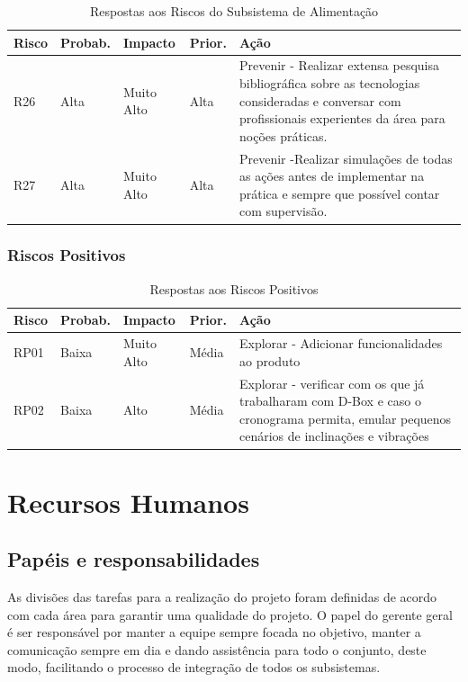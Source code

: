 \begin{table}[H]
\centering
\caption{Respostas aos Riscos do Subsistema de Alimentação}
\label{respostas-8}
\begin{tabular}{|l|l|l|l|p{9cm}|}
\hline
Risco & Probab.    & Impacto    & Prior. & Ação      \\
\hline


R26 & Alta & Muito Alto & Alta & Prevenir - Realizar extensa pesquisa bibliográfica sobre as tecnologias consideradas e conversar com profissionais experientes da área para noções práticas. \\
R27 & Alta & Muito Alto & Alta & Prevenir -Realizar simulações de todas as ações antes de implementar na prática e sempre que possível contar com supervisão. \\

\hline

\end{tabular}
\end{table}

\subsubsection{Riscos Positivos}

\begin{table}[ht]
\centering
\caption{Respostas aos Riscos Positivos}
\label{respostas-9}
\begin{tabular}{|l|l|l|l|p{9cm}|}
\hline
Risco & Probab.    & Impacto    & Prior. & Ação      \\
\hline
 
RP01 & Baixa & Muito Alto & Média & Explorar - Adicionar funcionalidades ao produto \\
RP02 & Baixa & Alto & Média & Explorar - verificar com os que já trabalharam com D-Box e caso o cronograma permita, emular pequenos cenários de inclinações e vibrações \\
\hline
\end{tabular}
\end{table}

\section{Recursos Humanos}
\subsection{Papéis e responsabilidades}

	As divisões das tarefas para a realização do projeto foram definidas de acordo com cada área para garantir uma qualidade do projeto. O papel do gerente geral é ser responsável por manter a equipe sempre focada no objetivo, manter a comunicação sempre em dia e dando assistência para todo o conjunto, deste modo, facilitando o processo de integração de todos os subsistemas. 
    
